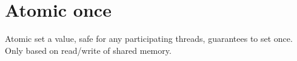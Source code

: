 \chapter{Atomic once}

Atomic set a value, safe for any participating threads, guarantees to set once.
Only based on read/write of shared memory.

%
%	
%
%
%
%
%	
%

